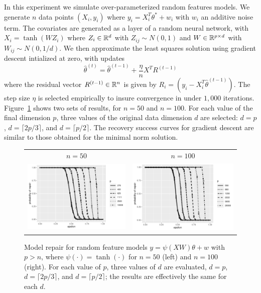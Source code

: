 In this experiment we simulate over-parameterized random features models.
We generate $n$ data points $(X_i, y_i)$ where
$y_i = X_i^T \theta^* + w_i$ with $w_i$ an additive noise term. The covariates are generated
as a layer of a random neural network, with $X_i = \tanh(WZ_i)$ where $Z_i \in\mathbb{R}^d$ with $Z_{ij} \sim N(0,1)$
and $W\in\mathbb{R}^{p\times d}$ with $W_{ij} \sim N(0, 1/d)$. We then approximate the least squares
solution using gradient descent intialized at zero, with updates
\begin{equation}
  \hat\theta^{(t)} = \hat\theta^{(t-1)} + \frac{\eta}{n} X^T R^{(t-1)}
\end{equation}
where the residual vector $R^{(t-1)}\in\mathbb{R}^n$ is given by $R_i = (y_i - X_i^ T\hat\theta^{(t-1)})$.
The step size $\eta$ is selected empirically to insure convergence in under $1{,}000$ iterations.
Figure~\ref{fig:rf} shows two sets of results, for $n=50$ and $n=100$. For each value of the final dimension $p$,
three values of the original data dimension $d$ are selected: $d=p$, $d=\lceil 2p/3\rceil$,
and $d=\lceil p/2\rceil$. The recovery success curves for gradient descent are similar to those obtained for the minimal norm solution.

\begin{figure}[t]
  \begin{center}
    \begin{tabular}{cc}
      {\scriptsize $n=50$} & {\scriptsize $n=100$} \\
      \includegraphics[width=.47\textwidth]{fig/plot-rf-50} &
      \includegraphics[width=.47\textwidth]{fig/plot-rf-100}\\[-10pt]
    \end{tabular}
  \end{center}
\caption{Model repair for random feature models $y=\psi(XW)\theta + w$ with $p>n$, where $\psi(\cdot) = \tanh(\cdot)$
for $n=50$ (left) and $n=100$ (right). For each value of $p$, three values of $d$ are evaluated, $d=p$, $d=\lceil 2p/3\rceil$,
and $d=\lceil p/2\rceil$; the results are effectively the same for each $d$.}
\label{fig:rf}
\end{figure}
